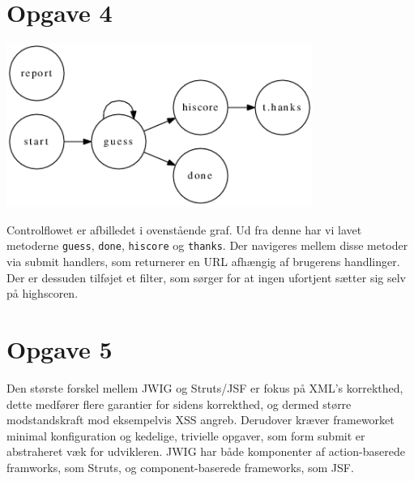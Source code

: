 \documentclass[a4paper,10pt]{article}
\begin{document}
\section*{Opgave 4}
\begin{center}
\includegraphics[width=10cm]{graphs/g0.png}
\end{center}
Controlflowet er afbilledet i ovenstående graf. Ud fra denne har vi lavet metoderne \texttt{guess},  \texttt{done},  \texttt{hiscore} og  \texttt{thanks}. Der navigeres mellem disse metoder via submit handlers, som returnerer en URL afhængig af brugerens handlinger. Der er dessuden tilføjet et filter, som sørger for at ingen ufortjent sætter sig selv på highscoren.  
\section*{Opgave 5}
Den største forskel mellem JWIG og Struts/JSF er fokus på XML's korrekthed, dette medfører flere garantier for sidens korrekthed, og dermed større modstandskraft mod eksempelvis XSS angreb. Derudover kræver frameworket minimal konfiguration og kedelige, trivielle opgaver, som form submit er abstraheret væk for udvikleren. JWIG har både komponenter af action-baserede framworks, som Struts, og component-baserede frameworks, som JSF.  

 
\end{document}
